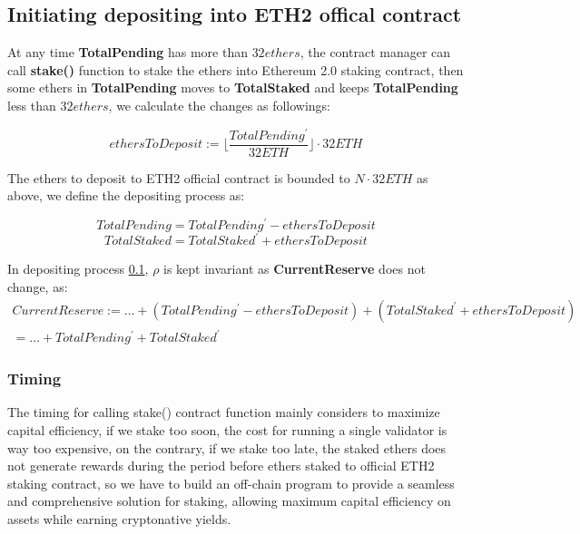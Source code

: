 \documentclass{article}
\begin{document}
\subsection{Initiating depositing into ETH2 offical contract}
\label{depositing}
At any time \textbf{TotalPending} has more than $32 ethers$, the contract manager can call \textbf{stake()} function to stake the ethers into Ethereum 2.0 staking contract, then some ethers in \textbf{TotalPending} moves to \textbf{TotalStaked} and keeps \textbf{TotalPending} less than $32 ethers$, we calculate the changes as followings:

\begin{lemma}
\[ethersToDeposit := \lfloor\frac{TotalPending^{\prime}}{32ETH}\rfloor \cdot 32ETH\]
\end{lemma}

The ethers to deposit to ETH2 official contract is bounded to $N\cdot 32ETH$ as above, we define the depositing process as:

\begin{theorem}
\label{depositing_vars}
\[TotalPending = TotalPending^{\prime} - ethersToDeposit \]
\[TotalStaked = TotalStaked^{\prime} + ethersToDeposit \]
\end{theorem}

In depositing process \ref{depositing}, $\rho$ is kept invariant as \textbf{CurrentReserve} does not change, as:
\begin{multline}
CurrentReserve := \dots + (TotalPending^{\prime} - ethersToDeposit) + (TotalStaked^{\prime} + ethersToDeposit) \\
= \dots + TotalPending^{\prime} + TotalStaked^{\prime} 
\end{multline}

\subsubsection{Timing}
The timing for calling stake() contract function mainly considers to maximize capital efficiency, if we stake too soon, the cost for running a single validator is way too expensive, on the contrary, if we stake too late, the staked ethers does not generate rewards during the period before ethers staked to official ETH2 staking contract, so we have to build an off-chain program to provide a seamless and comprehensive solution for staking, allowing maximum capital efficiency on assets while earning cryptonative yields.
\end{document}
